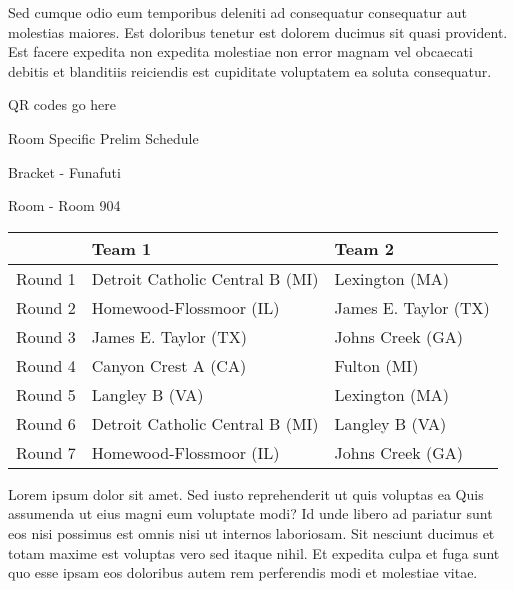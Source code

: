 \documentclass{article}%
\begin{document}
\newline%
Sed cumque odio eum temporibus deleniti ad consequatur consequatur aut molestias maiores. Est doloribus tenetur est dolorem ducimus sit quasi provident. Est facere expedita non expedita molestiae non error magnam vel obcaecati debitis et blanditiis reiciendis est cupiditate voluptatem ea soluta consequatur.%
\vspace*{140pt}%
\begin{center}%
\begin{Huge}%
QR codes go here%
\end{Huge}%
\end{center}%
\newpage%
\begin{center}%
\begin{Huge}%
Room Specific Prelim Schedule%
\end{Huge}%
\vspace*{8pt}%
\linebreak%
\begin{Large}%
Bracket {-} Funafuti%
\end{Large}%
\vspace*{8pt}%
\linebreak%
\vspace*{8pt}%
\begin{Large}%
Room {-} Room 904%
\end{Large}%
\end{center}%
%
\begin{tabularx}{\textwidth}{|c|Y|Y|}%
\hline%
&Team 1&Team 2\\%
\hline%
Round 1&Detroit Catholic Central B (MI)&Lexington (MA)\\%
Round 2&Homewood{-}Flossmoor (IL)&James E. Taylor (TX)\\%
Round 3&James E. Taylor (TX)&Johns Creek (GA)\\%
Round 4&Canyon Crest A (CA)&Fulton (MI)\\%
Round 5&Langley B (VA)&Lexington (MA)\\%
Round 6&Detroit Catholic Central B (MI)&Langley B (VA)\\%
Round 7&Homewood{-}Flossmoor (IL)&Johns Creek (GA)\\%
\hline%
\end{tabularx}%
\vspace*{8pt}%
\newline%
Lorem ipsum dolor sit amet. Sed iusto reprehenderit ut quis voluptas ea Quis assumenda ut eius magni eum voluptate modi? Id unde libero ad pariatur sunt eos nisi possimus est omnis nisi ut internos laboriosam. Sit nesciunt ducimus et totam maxime est voluptas vero sed itaque nihil. Et expedita culpa et fuga sunt quo esse ipsam eos doloribus autem rem perferendis modi et molestiae vitae.\newline%
\end{document}
